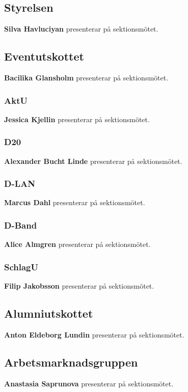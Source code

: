 \documentclass[../protokoll_hostmote_2021.tex]{subfiles}
\begin{document}
\subsection{Styrelsen}
\textbf{Silva Havluciyan} presenterar på sektionsmötet. 
 


\subsection{Eventutskottet}
\textbf{Bacilika Glansholm} presenterar på sektionsmötet.



\subsubsection{AktU}
\textbf{Jessica Kjellin} presenterar på sektionsmötet.



\subsubsection{D20}
\textbf{Alexander Bucht Linde} presenterar på sektionsmötet. 



\subsubsection{D-LAN}
\textbf{Marcus Dahl} presenterar på sektionsmötet. 



\subsubsection{D-Band}
\textbf{Alice Almgren} presenterar på sektionsmötet. 



\subsubsection{SchlagU}
\textbf{Filip Jakobsson} presenterar på sektionsmötet. 



\subsection{Alumniutskottet}
\textbf{Anton Eldeborg Lundin} presenterar på sektionsmötet. 



\subsection{Arbetsmarknadsgruppen}
\textbf{Anastasia Saprunova} presenterar på sektionsmötet. 
\end{document}

